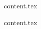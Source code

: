 \documentclass{ugent-thesis}
\begin{document}
    \makefront

    \body
    {content.tex}

    \makebibliography
    
    \appendix
    {content.tex}

    \makeback
\end{document}
